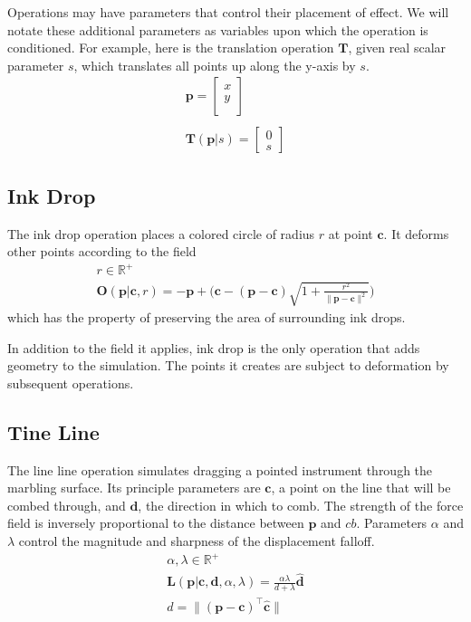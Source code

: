 \documentclass{article}
\newcommand{\cb}{\boldsymbol{c}}
\newcommand{\db}{\boldsymbol{d}}
\newcommand{\pb}{\boldsymbol{p}}
\newcommand{\Tb}{\boldsymbol{T}}
\begin{document}
Operations may have parameters that control their placement of effect. We will notate these additional parameters as variables upon which the operation is conditioned. For example, here is the translation operation $\Tb$, given real scalar parameter $s$, which translates all points up along the y-axis by $s$. 
\begin{gather*}
			\pb = \begin{bmatrix}
	x \\
	y\\
	\end{bmatrix}\\
	\\
	\Tb(\pb | s) = \begin{bmatrix}
	0 \\
	s
	\end{bmatrix}
\end{gather*}

\subsection{Ink Drop}

The ink drop operation places a colored circle of radius $r$ at point $\cb$. It deforms other points according to the field 
\begin{gather*}
	r \in \mathbb{R}^+\\
	\boldsymbol{O}(\pb | \cb, r) =  -\pb + \Bigg(\cb - (\pb - \cb )\sqrt{1 + \frac{r^2}{\lVert\pb - \cb\rVert^2}}\Bigg)
\end{gather*}
which has the property of preserving the area of surrounding ink drops.

In addition to the field it applies, ink drop is the only operation that adds geometry to the simulation. The points it creates are subject to deformation by subsequent operations. 

\subsection{Tine Line}
The line line operation simulates dragging a pointed instrument through the marbling surface. Its principle parameters are $\cb$, a point on the line that will be combed through, and $\db$, the direction in which to comb. The strength of the force field is inversely proportional to the distance between $\pb$ and $cb$. Parameters $\alpha$ and $\lambda$ control the magnitude and sharpness of the displacement falloff. 
\begin{gather*} 
	\alpha, \lambda \in \mathbb{R}^+\\
	\boldsymbol{L}(\pb | \cb, \db, \alpha, \lambda) = \frac{\alpha\lambda}{d + \lambda}\hat{\db} \\	
    d = \lVert(\pb - \cb) ^ \top \hat{\cb}\rVert
\end{gather*}
\end{document}
